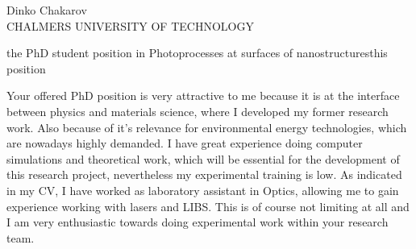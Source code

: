\documentclass{letter}
\begin{document}
\begin{letter}{Dinko Chakarov\\
CHALMERS UNIVERSITY OF TECHNOLOGY}

\begin{content}{the PhD student position in Photoprocesses
at surfaces of nanostructures}{this position}

Your offered PhD position is very attractive to me because
it is at the interface between physics and materials science,
where I developed my former research work. Also because of it's relevance 
for environmental energy technologies, which are nowadays highly
demanded. I have great experience doing computer simulations and
theoretical work, which will be essential for the development of this
research project, nevertheless my experimental training is low. As indicated
in my CV, I have worked as laboratory assistant in Optics, allowing
me to gain experience working with lasers and LIBS. This is of course
not limiting at all and I am very enthusiastic towards doing experimental
work within your research team.

\end{content}

\end{letter}
\end{document}
